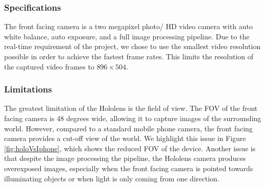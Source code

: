 \subsubsection{Specifications}
The front facing camera is a two megapixel photo/ HD video camera with auto white balance, auto exposure, and a full image processing pipeline. Due to the real-time requirement of the project, we chose to use the smallest video resolution possible in order to achieve the fastest frame rates. This limits the resolution of the captured video frames to $896\times 504$.

\subsubsection{Limitations} \label{sec:framerate}
The greatest limitation of the Hololens is the field of view. The FOV of the front facing camera is 48 degrees wide, allowing it to capture images of the surrounding world. However, compared to a standard mobile phone camera, the front facing camera provides a cut-off view of the world. We highlight this issue in Figure \ref{fig:holoVsIphone}, which shows the reduced FOV of the device. Another issue is that despite the image processing the pipeline, the Hololens camera produces overexposed images, especially when the front facing camera is pointed towards illuminating objects or when light is only coming from one direction. 

